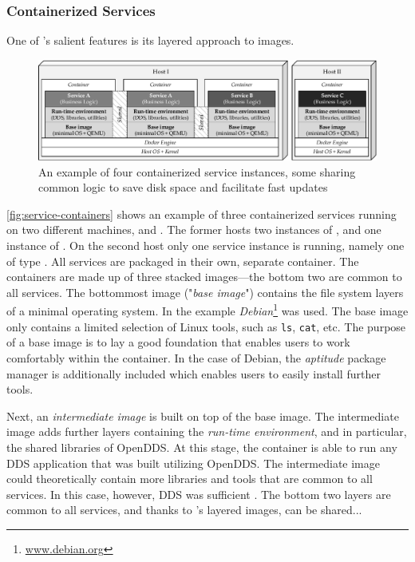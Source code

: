 \subsubsection{Containerized Services}
One of \docker 's salient features is its layered approach to images.

\begin{figure}[htpb]
  \centering
  \includegraphics[width=\textwidth]{figures/docker-sharing}
  \caption[An example of containerized services]{An example of four containerized service instances, some sharing common logic to save disk space and facilitate fast updates}\label{fig:service-containers} 
\end{figure}

\autoref{fig:service-containers} shows an example of three containerized services running on two different machines,  and . The former hosts two instances of , and one instance of . On the second host only one service instance is running, namely one of type . All services are packaged in their own, separate container. The containers are made up of three stacked images---the bottom two are common to all services. The bottommost image ("\emph{base image}") contains the file system layers of a minimal operating system. In the example  \emph{Debian}\footnote{\url{www.debian.org}} was used. The base image only contains a limited selection of Linux tools, such as \texttt{ls}, \texttt{cat}, etc. The purpose of a base image is to lay a good foundation that enables users to work comfortably within the container. In the case of Debian, the \emph{aptitude} package manager is additionally included which enables users to easily install further  tools. 

Next, an \emph{intermediate image} is built on top of the base image. The intermediate image adds further layers containing the \emph{run-time environment}, and in particular, the shared libraries of OpenDDS. At this stage, the container is able to run any DDS application that was built utilizing OpenDDS. The intermediate image could theoretically contain more libraries and tools that are common to all services. In this case, however, DDS was sufficient . The bottom two layers are common to all services, and thanks to \docker 's layered images, can be shared... 

